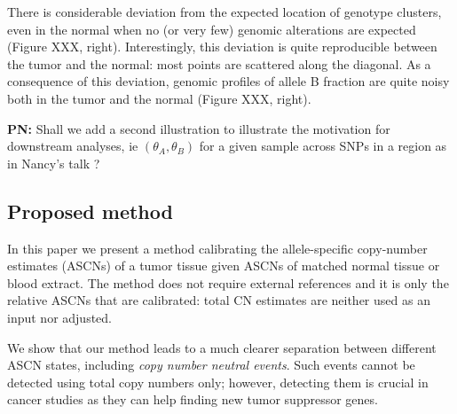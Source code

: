 \documentclass[10pt]{bmc_article}
\newenvironment{bmcformat}{\fussy\setboolean{publ}{true}}{\fussy}
\newenvironment{PN}{\color{blue}\textbf{PN:}}{}
\begin{document}
\begin{bmcformat}
There is considerable deviation from the expected location of genotype clusters, even in the normal when no (or very few) genomic alterations are expected (Figure XXX, right). Interestingly, this deviation is quite reproducible between the tumor and the normal: most points are scattered along the diagonal. As a consequence of this deviation, genomic profiles of allele B fraction are quite noisy both in the tumor and the normal (Figure XXX, right). 

\begin{PN}
  Shall we add a second illustration to illustrate the motivation for downstream analyses, ie  $(\theta_A,\theta_B)$ for a given sample across SNPs in a region as in Nancy's talk ?
\end{PN}

\subsection*{Proposed method}

In this paper we present a method calibrating the allele-specific copy-number estimates (ASCNs) of a tumor tissue given ASCNs of matched normal tissue or blood extract.  The method does not require external references and it is only the relative ASCNs that are calibrated: total CN estimates are neither used as an input nor adjusted.

We show that our method leads to a much clearer separation between different ASCN states, including \emph{copy number neutral events}. Such events cannot be detected using total copy numbers only; however, detecting them is crucial in cancer studies as they can help finding new tumor suppressor genes.


\end{bmcformat}
\end{document}
